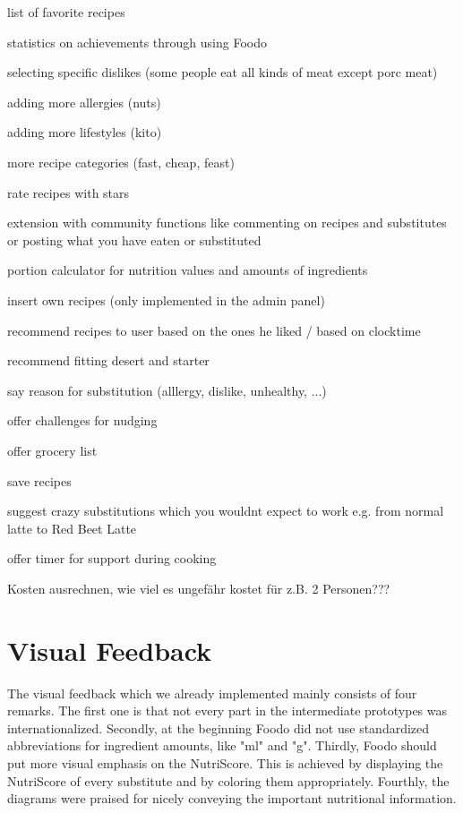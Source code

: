list of favorite recipes

statistics on achievements through using Foodo

selecting specific dislikes (some people eat all kinds of meat except porc meat)


adding more allergies (nuts) 

adding more lifestyles (kito)

more recipe categories (fast, cheap, feast)

rate recipes with stars

extension with community functions like commenting on recipes and substitutes or posting what you have eaten or substituted

portion calculator for nutrition values and amounts of ingredients

insert own recipes (only implemented in the admin panel)

recommend recipes to user based on the ones he liked / based on clocktime

recommend fitting desert and starter

say reason for substitution (alllergy, dislike, unhealthy, ...)

offer challenges for nudging

offer grocery list

save recipes

suggest crazy substitutions which you wouldnt expect to work e.g. from normal latte to  Red Beet Latte

offer timer for support during cooking

Kosten ausrechnen, wie viel es ungefähr kostet für z.B. 2 Personen???
    
\section{Visual Feedback}


The visual feedback which we already implemented mainly consists of four remarks. The first one is that not every part in the intermediate prototypes was internationalized. Secondly, at the beginning Foodo did not use standardized abbreviations for ingredient amounts, like "ml" and "g". Thirdly, Foodo should put more visual emphasis on the NutriScore. This is achieved by displaying the NutriScore of every substitute and by coloring them appropriately. Fourthly, the diagrams were praised for nicely conveying the important nutritional information. 

